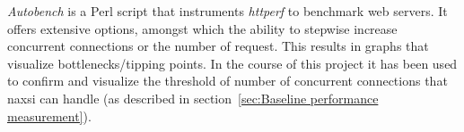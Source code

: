 \emph{Autobench} is a Perl script that instruments \emph{httperf} to benchmark web servers. It offers extensive options, amongst which the ability to stepwise increase concurrent connections or the number of request. This results in graphs that visualize bottlenecks/tipping points. In the course of this project it has been used to confirm and visualize the threshold of number of concurrent connections that naxsi can handle (as described in section~\ref{sec:Baseline performance measurement}).
